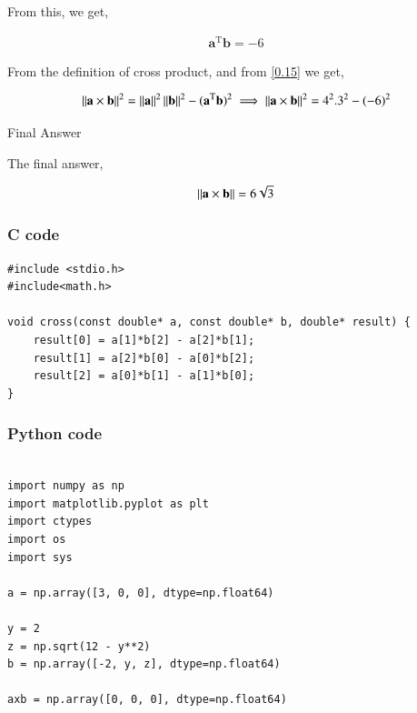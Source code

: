 \documentclass{beamer}
\begin{document}
\begin{frame}

From this, we get,

\begin{align}
    \textbf{a}^\text{T}\textbf{b}=-6
    \label{0.15}
\end{align}

From the definition of cross product, and from \ref{0.15} we get,

\begin{align}
    \left\lVert\textbf{a} \times \textbf{b}\right\rVert^2 = \left\lVert\textbf{a}\right\rVert^2 \left\lVert\textbf{b}\right\rVert^2-(\textbf{a}^\text{T}\textbf{b})^2 
    \implies \left\lVert\textbf{a} \times \textbf{b}\right\rVert^2 = 4^2 . 3^2 -(-6)^2
    \label{0.16}
\end{align}

\end{frame}
\begin{frame}{Final Answer}

The final answer,

\begin{align}
    \left\lVert\textbf{a} \times \textbf{b}\right\rVert = 6\sqrt{3}
\end{align}
\end{frame}


\begin{frame}[fragile]
\frametitle{C code}
\begin{lstlisting}
#include <stdio.h>
#include<math.h>

void cross(const double* a, const double* b, double* result) {
    result[0] = a[1]*b[2] - a[2]*b[1];
    result[1] = a[2]*b[0] - a[0]*b[2];
    result[2] = a[0]*b[1] - a[1]*b[0];
}

\end{lstlisting}
\end{frame}

\begin{frame}[fragile]
\frametitle{Python code}
\begin{lstlisting}

import numpy as np
import matplotlib.pyplot as plt
import ctypes
import os
import sys

a = np.array([3, 0, 0], dtype=np.float64)

y = 2
z = np.sqrt(12 - y**2)
b = np.array([-2, y, z], dtype=np.float64)  

axb = np.array([0, 0, 0], dtype=np.float64)

\end{lstlisting}
\end{frame}
\end{document}
